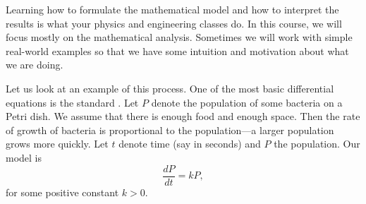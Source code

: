 Learning how to formulate the mathematical model and how to interpret the
results is what your physics and engineering classes do.  In this
course, we will focus mostly on the mathematical analysis.  Sometimes we will
work with simple real-world examples so that we have some intuition and
motivation about what we are doing.

Let us look at 
an example of this process.
One of the most basic differential equations
is the standard \emph{}.
Let $P$ denote the population 
of some bacteria on a Petri dish.  We assume that there is enough food
and enough space.  Then the rate of growth of bacteria is proportional
to the population---a larger population grows more quickly.  Let $t$ denote
time (say in seconds) and $P$ the population.  Our model
is
\begin{equation*}
\frac{dP}{dt} = kP ,
\end{equation*}
for some positive constant $k > 0$.


